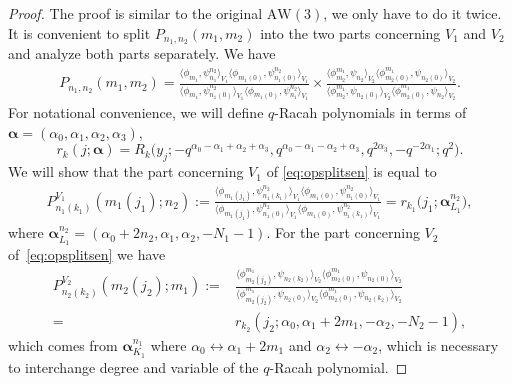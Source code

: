 \documentclass[pdftex]{sigma}
\numberwithin{equation}{section}
\newcommand{\aw}{\mathrm{AW}\!\left(3\right)}
\begin{document}
\begin{proof}
	The proof is similar to the original $\aw$, we only have to do it twice. It is convenient to split $P_{n_1,n_2}(m_1,m_2)$ into the two parts concerning $V_1$ and $V_2$ and analyze both parts separately. We have
	\begin{gather}
		P_{n_1,n_2}(m_1,m_2) = \frac{\big\langle \phi_{m_1},\psi_{n_1}^{n_2}\big\rangle _{V_1}\big\langle \phi_{m_1(0)},\psi_{n_1(0)}^{n_2}\big\rangle _{V_1}}{\big\langle \phi_{m_1},\psi_{n_1(0)}^{n_2}\big\rangle _{V_1}\big\langle \phi_{m_1(0)},\psi_{n_1}^{n_2}\big\rangle _{V_1}} \times\frac{\big\langle \phi_{m_2}^{m_1}, \psi_{n_2}\big\rangle _{ V_2}\big\langle \phi_{m_2(0)}^{m_1}, \psi_{n_2(0)}\big\rangle _{ V_2}}{\big\langle \phi_{m_2}^{m_1}, \psi_{n_2(0)}\big\rangle _{ V_2}\big\langle \phi_{m_2(0)}^{m_1}, \psi_{n_2}\big\rangle _{ V_2}}.\label{eq:opsplitsen}
	\end{gather}
	For notational convenience, we will define $q$-Racah polynomials in terms of $\bm{\alpha}=(\alpha_0,\alpha_1,\alpha_2,\alpha_3)$,
	\[
	r_{k}(j;\bm{\alpha})=R_k\big(y_j;-q^{\alpha_0-\alpha_1+\alpha_2+\alpha_3},q^{\alpha_0-\alpha_1-\alpha_2+\alpha_3},q^{2\alpha_3},-q^{-2\alpha_1};q^2\big).
	\]
	We will show that the part concerning $V_1$ of \eqref{eq:opsplitsen} is equal to
	\begin{gather}
P_{n_1(k_1)}^{V_1}(m_1(j_1);n_2):=\frac{\big\langle \phi_{m_1(j_1)},\psi_{n_1(k_1)}^{n_2}\big\rangle _{V_1}\big\langle \phi_{m_1(0)},\psi_{n_1(0)}^{n_2}\big\rangle _{V_1}}{\big\langle \phi_{m_1(j_1)},\psi_{n_1(0)}^{n_2}\big\rangle _{V_1}\big\langle \phi_{m_1(0)},\psi_{n_1(k_1)}^{n_2}\big\rangle _{V_1}} = r_{k_1}\big(j_1;\bm{\alpha}_{L_1}^{n_2}\big),\label{eq:polracah1}
	\end{gather}
	where $\bm{\alpha}_{L_1}^{n_2}=(\alpha_0+2n_2,\alpha_1,\alpha_2,-N_1-1)$.
	For the part concerning $V_2$ of~\eqref{eq:opsplitsen} we have
	\begin{align}
P_{n_2(k_2)}^{V_2}(m_2(j_2);m_1):={}&\frac{\big\langle \phi_{m_2(j_2)}^{m_1},\psi_{n_2(k_2)}\big\rangle _{ V_2}\big\langle \phi_{m_2(0)}^{m_1}, \psi_{n_2(0)}\big\rangle _{ V_2}}{\big\langle \phi_{m_2(j_2)}^{m_1}, \psi_{n_2(0)}\big\rangle _{ V_2}\big\langle \phi_{m_2(0)}^{m_1}, \psi_{n_2(k_2)}\big\rangle _{ V_2}}\nonumber\\
={} &r_{k_2}(j_2;\alpha_0,\alpha_1+2m_1,-\alpha_2,-N_2-1), \label{eq:polracah2}
	\end{align}
	which comes from $\bm{\alpha}_{K_1}^{n_1}$ where $\alpha_0 \leftrightarrow \alpha_1+2m_1$ and $\alpha_2\leftrightarrow -\alpha_2$, which is necessary to interchange degree and variable of the $q$-Racah polynomial.
	

\end{proof}
\end{document}
